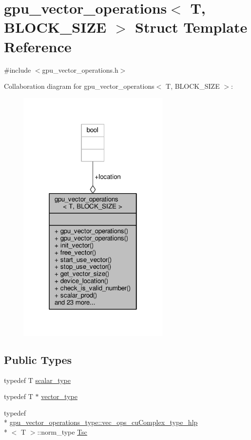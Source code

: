 \hypertarget{structgpu__vector__operations}{\section{gpu\-\_\-vector\-\_\-operations$<$ T, B\-L\-O\-C\-K\-\_\-\-S\-I\-Z\-E $>$ Struct Template Reference}
\label{structgpu__vector__operations}
}


{\ttfamily \#include $<$gpu\-\_\-vector\-\_\-operations.\-h$>$}



Collaboration diagram for gpu\-\_\-vector\-\_\-operations$<$ T, B\-L\-O\-C\-K\-\_\-\-S\-I\-Z\-E $>$\-:
\nopagebreak
\begin{figure}[H]
\begin{center}
\leavevmode
\includegraphics[width=214pt]{structgpu__vector__operations__coll__graph}
\end{center}
\end{figure}
\subsection*{Public Types}
\begin{DoxyCompactItemize}
\item 
typedef T \hyperlink{structgpu__vector__operations_aaa9d1dc877967fabc2262c4a25e4796f}{scalar\-\_\-type}
\item 
typedef T $\ast$ \hyperlink{structgpu__vector__operations_adfa9fd444da5616e33af37604dc206ba}{vector\-\_\-type}
\item 
typedef \\*
\hyperlink{structgpu__vector__operations__type_1_1vec__ops__cuComplex__type__hlp}{gpu\-\_\-vector\-\_\-operations\-\_\-type\-::vec\-\_\-ops\-\_\-cu\-Complex\-\_\-type\-\_\-hlp}\\*
$<$ T $>$\-::norm\-\_\-type \hyperlink{structgpu__vector__operations_a1a029004898ae03eae1de4c8c8f4f824}{Tsc}
\end{DoxyCompactItemize}
